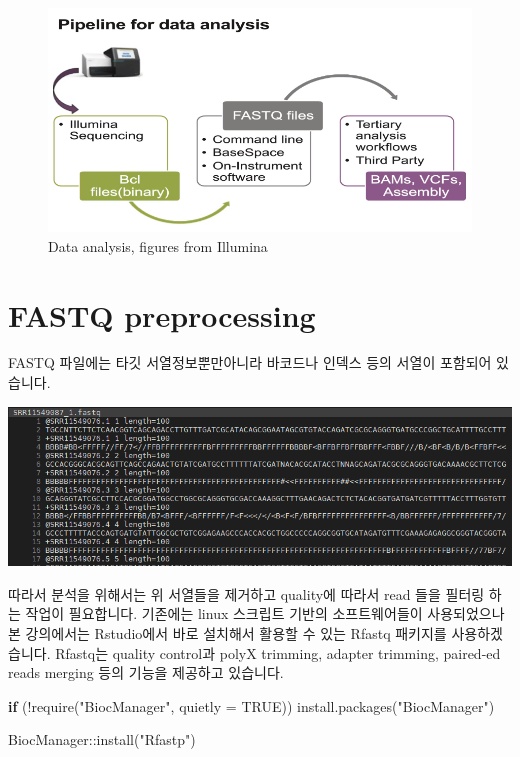 \documentclass[
]{book}
\newenvironment{Shaded}{\begin{snugshade}}{\end{snugshade}}
\newcommand{\AttributeTok}[1]{\textcolor[rgb]{0.77,0.63,0.00}{#1}}
\newcommand{\ConstantTok}[1]{\textcolor[rgb]{0.00,0.00,0.00}{#1}}
\newcommand{\ControlFlowTok}[1]{\textcolor[rgb]{0.13,0.29,0.53}{\textbf{#1}}}
\newcommand{\FunctionTok}[1]{\textcolor[rgb]{0.00,0.00,0.00}{#1}}
\newcommand{\NormalTok}[1]{#1}
\newcommand{\SpecialCharTok}[1]{\textcolor[rgb]{0.00,0.00,0.00}{#1}}
\newcommand{\StringTok}[1]{\textcolor[rgb]{0.31,0.60,0.02}{#1}}
\begin{document}
\begin{figure}
\centering
\includegraphics[width=5.20833in,height=\textheight]{images/12/NGS_data_analysis.png}
\caption{Data analysis, figures from Illumina}
\end{figure}

\hypertarget{fastq-preprocessing}{%
\section{FASTQ preprocessing}\label{fastq-preprocessing}}

FASTQ 파일에는 타깃 서열정보뿐만아니라 바코드나 인덱스 등의 서열이 포함되어 있습니다.

\includegraphics{images/12/fastq.png}

따라서 분석을 위해서는 위 서열들을 제거하고 quality에 따라서 read 들을 필터링 하는 작업이 필요합니다. 기존에는 linux 스크립트 기반의 소프트웨어들이 사용되었으나 본 강의에서는 Rstudio에서 바로 설치해서 활용할 수 있는 Rfastq 패키지를 사용하겠습니다. Rfastq는 quality control과 polyX trimming, adapter trimming, paired-ed reads merging 등의 기능을 제공하고 있습니다.

\begin{Shaded}
\begin{Highlighting}[]
\ControlFlowTok{if}\NormalTok{ (}\SpecialCharTok{!}\FunctionTok{require}\NormalTok{(}\StringTok{"BiocManager"}\NormalTok{, }\AttributeTok{quietly =} \ConstantTok{TRUE}\NormalTok{))}
    \FunctionTok{install.packages}\NormalTok{(}\StringTok{"BiocManager"}\NormalTok{)}

\NormalTok{BiocManager}\SpecialCharTok{::}\FunctionTok{install}\NormalTok{(}\StringTok{"Rfastp"}\NormalTok{)}
\end{Highlighting}
\end{Shaded}
\end{document}
